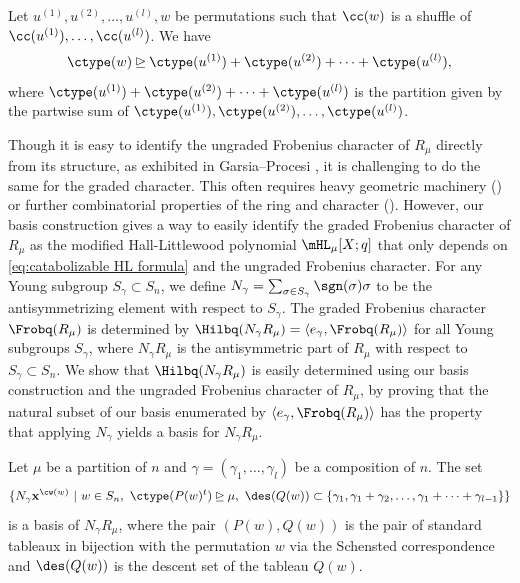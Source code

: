 \begin{thm2}
    Let $u^{(1)}, u^{(2)}, \dots, u^{(l)}, w$ be
    permutations such that $\cc(w)$ is a shuffle of $\cc(u^{(1)}),\dots, \cc(u^{(l)})$.
    We have
    \[\ctype(w) \unrhd \ctype(u^{(1)}) + \ctype( u^{(2)}) + \cdots+ \ctype(u^{(l)}),\]
    where $\ctype(u^{(1)}) + \ctype( u^{(2)}) + \cdots +  \ctype(u^{(l)})$ is the partition given by the partwise sum of $\ctype(u^{(1)}),\ctype( u^{(2)}),\dots,\ctype(u^{(l)})$.
\end{thm2}


Though it is easy to identify the ungraded Frobenius character of $R_\mu$ directly from its structure, as exhibited in Garsia--Procesi \cite{GP}, it is challenging to do the same for the graded character. This often requires heavy geometric machinery (\cite{deCon-Proc}) or further combinatorial properties of the ring and character (\cite{GP}).
However, our basis construction gives a way to easily identify the graded Frobenius character of $R_\mu$ as the modified Hall-Littlewood polynomial $\mHL_\mu[X;q]$ that only depends on \eqref{eq:catabolizable HL formula} and the ungraded Frobenius character.
For any Young subgroup $S_\gamma \subset S_n$, we define $N_{\gamma} = \sum_{\sigma\in S_\gamma} \sgn(\sigma) \sigma$ to be the antisymmetrizing element with respect to $S_\gamma$.
The graded Frobenius character $\Frobq(R_{\mu})$ is determined by $\Hilbq(N_\gamma R_{\mu}) = \langle e_\gamma, \Frobq(R_{\mu})\rangle$ for all Young subgroups $S_\gamma$, where $N_\gamma R_{\mu}$ is the antisymmetric part of $R_{\mu}$ with respect to $S_\gamma\subset S_n$.
We show that $\Hilbq(N_\gamma R_{\mu})$ is easily determined using our basis construction and the ungraded Frobenius character of $R_{\mu}$, by proving that the natural subset of our basis enumerated by $\langle e_\gamma, \Frobq(R_{\mu})\rangle$ has the property that applying $N_\gamma$ yields a basis for $N_\gamma R_{\mu}$.


\begin{prop2}\makeatletter{}\makeatother\label{prop2}
  Let $ \mu$ be a partition of $n$ and $\gamma = (\gamma_1,\dots, \gamma_l)$ be a composition of $n$. 
   The set
      \[ \{ N_\gamma \mathbf{x}^{\cw(w)} \ | \  w \in S_n, \ \ctype(P(w)^t) \unrhd\mu, \ \des(Q(w)) \subset \{\gamma_1,\gamma_1 + \gamma_2, \dots, \gamma_1 + \cdots + \gamma_{l-1}\}\}\]
    is a basis of $N_\gamma R_{\mu}$, where the pair $(P(w),Q(w))$ is the pair of standard tableaux in bijection with the permutation $w$ via the Schensted correspondence and $\des(Q(w))$ is the descent set of the tableau $Q(w)$.
\end{prop2}

